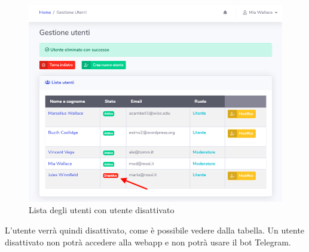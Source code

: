 		\begin{figure}[H]
		\centering
		\includegraphics[scale=0.600]{res/images/mod/utenteDisatt.png}
		\caption{Lista degli utenti con utente disattivato}
	\end{figure}
	L'utente verrà quindi disattivato, come è possibile vedere dalla tabella. Un utente disattivato non potrà accedere alla webapp e non potrà usare il bot Telegram.

